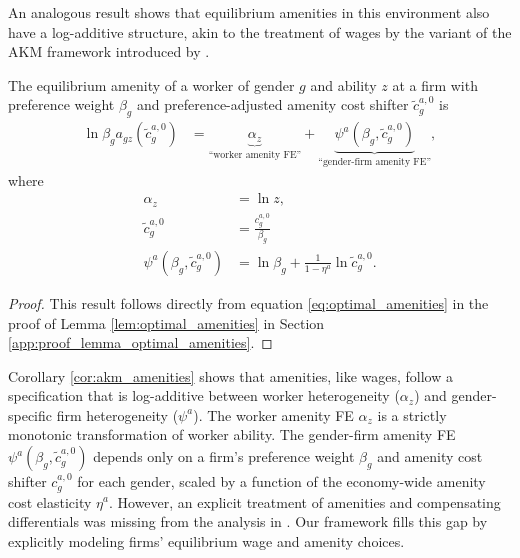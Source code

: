 An analogous result shows that equilibrium amenities in this environment also have a log-additive structure, akin to the treatment of wages by the variant of the AKM framework introduced by \citet{CardCardosoKline2016}.
%
\newcommand{\CorEquilibriumAmenityEquation}[2]{%
    The equilibrium amenity of a worker of gender $g$ and ability $z$ at a firm with preference weight $\beta_{g}$ and preference-adjusted amenity cost shifter $\tilde{c}_{g}^{a,0}$ is
    \begin{align}
        \ln \beta_{g} a_{gz}\left(\tilde{c}_{g}^{a,0} \right) %
        &= \underbrace{\alpha_{z}}_{\text{``worker amenity FE''}} + \underbrace{ \psi^{a} \left( \beta_{g}, \tilde{c}_{g}^{a,0} \right) }_{\text{``gender-firm amenity FE''}}, \label{#1}
    \end{align}
    where
    \begin{align}
        \alpha_{z} %
        &= \ln z, \\
        \tilde{c}_{g}^{a,0} %
        & = \frac{c_{g}^{a,0}}{\beta_{g}} \\
        \psi^{a} \left( \beta_{g}, \tilde{c}_{g}^{a,0} \right) %
        &= \ln \beta_{g} + \frac{1}{1 - \eta^{a}} \ln \tilde{c}_{g}^{a,0}. \label{#2}
    \end{align}
}
%
\begin{corollary}
    \label{cor:akm_amenities}
    \CorEquilibriumAmenityEquation{eq:prop_AKM_amenities}{eq:psi_amenities}
\end{corollary}
%
\begin{proof}
    This result follows directly from equation \eqref{eq:optimal_amenities} in the proof of Lemma \ref{lem:optimal_amenities} in Section \ref{app:proof_lemma_optimal_amenities}.
\end{proof}
%
Corollary \ref{cor:akm_amenities} shows that amenities, like wages, follow a specification that is log-additive between worker heterogeneity ($\alpha_{z}$) and gender-specific firm heterogeneity ($\psi^{a}$). The worker amenity FE $\alpha_{z}$ is a strictly monotonic transformation of worker ability. The gender-firm amenity FE $\psi^{a}(\beta_{g}, \tilde{c}_{g}^{a,0})$ depends only on a firm's preference weight $\beta_{g}$ and amenity cost shifter $c_{g}^{a,0}$ for each gender, scaled by a function of the economy-wide amenity cost elasticity $\eta^{a}$. However, an explicit treatment of amenities and compensating differentials was missing from the analysis in \citet{CardCardosoKline2016}. Our framework fills this gap by explicitly modeling firms' equilibrium wage and amenity choices.


